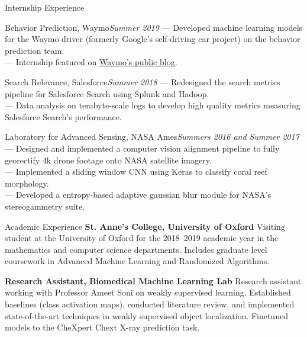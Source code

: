 \documentclass{resume} %
\begin{document}
\begin{rSection}{Internship Experience}
	{
		\begin{rSubsection}{Behavior Prediction,  Waymo}{\em Summer 2019}{}{}
			--- Developed machine learning models for the Waymo driver (formerly Google's self-driving car project) on the behavior prediction team. \\
			--- Internship featured on \href{https://blog.waymo.com/2019/12/from-hosted-to-host-internship.html}{\underline{Waymo's public blog}}.
		\end{rSubsection}
	}
	{
		\begin{rSubsection}{Search Relevance, Salesforce}{\em Summer 2018}{}{}
			--- Redesigned the search metrics pipeline for Salesforce Search using Splunk and Hadoop. \\
			--- Data analysis on terabyte-scale logs to develop high quality metrics measuring Salesforce Search's performance.
		\end{rSubsection}
	}
	{
		\begin{rSubsection}{Laboratory for Advanced Sensing, NASA Ames}{\em Summers 2016 and Summer 2017}{}{}
			--- Designed and implemented a computer vision alignment pipeline to fully georectify 4k drone footage onto NASA satellite imagery. \\
			--- Implemented a sliding window CNN using Keras to classify coral reef morphology. \\
			--- Developed a entropy-based adaptive gaussian blur module for NASA's stereogammetry suite.
		\end{rSubsection}
	}

\end{rSection}  %

\begin{rSection}{Academic Experience}
	{\textbf{St. Anne's College, University of Oxford} Visiting student at the University of Oxford for the 2018--2019 academic year in the mathematics and computer science departments. Includes graduate level coursework in Advanced Machine Learning and Randomized Algorithms.}

	{\textbf{Research Assistant, Biomedical Machine Learning Lab} Research assistant working with Professor Ameet Soni on weakly supervised learning. Established baselines (class activation maps), conducted literature review, and implemented state-of-the-art techniques in weakly supervised object localization. Finetuned models to the CheXpert Chext X-ray prediction task.}
\end{rSection}  %
\end{document}

